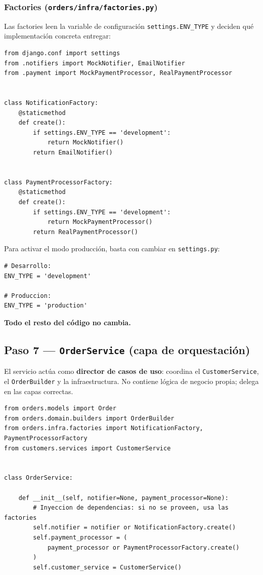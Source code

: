 \documentclass[12pt, a4paper]{article}
\begin{document}
\subsubsection{Factories (\texttt{orders/infra/factories.py})}

Las factories leen la variable de configuración \texttt{settings.ENV\_TYPE} y deciden qué implementación concreta entregar:

\begin{lstlisting}[caption={orders/infra/factories.py}]
from django.conf import settings
from .notifiers import MockNotifier, EmailNotifier
from .payment import MockPaymentProcessor, RealPaymentProcessor


class NotificationFactory:
    @staticmethod
    def create():
        if settings.ENV_TYPE == 'development':
            return MockNotifier()
        return EmailNotifier()


class PaymentProcessorFactory:
    @staticmethod
    def create():
        if settings.ENV_TYPE == 'development':
            return MockPaymentProcessor()
        return RealPaymentProcessor()
\end{lstlisting}

Para activar el modo producción, basta con cambiar en \texttt{settings.py}:

\begin{lstlisting}[caption={CEFUSAECommerce/settings.py}]
# Desarrollo:
ENV_TYPE = 'development'

# Produccion:
ENV_TYPE = 'production'
\end{lstlisting}

\textbf{Todo el resto del código no cambia.}

\subsection{Paso 7 — \texttt{OrderService} (capa de orquestación)}

El servicio actúa como \textbf{director de casos de uso}: coordina el \texttt{CustomerService}, el \texttt{OrderBuilder} y la infraestructura. No contiene lógica de negocio propia; delega en las capas correctas.

\begin{lstlisting}[caption={orders/services.py — constructor e inyección de dependencias}]
from orders.models import Order
from orders.domain.builders import OrderBuilder
from orders.infra.factories import NotificationFactory, PaymentProcessorFactory
from customers.services import CustomerService


class OrderService:

    def __init__(self, notifier=None, payment_processor=None):
        # Inyeccion de dependencias: si no se proveen, usa las factories
        self.notifier = notifier or NotificationFactory.create()
        self.payment_processor = (
            payment_processor or PaymentProcessorFactory.create()
        )
        self.customer_service = CustomerService()
\end{lstlisting}
\end{document}
